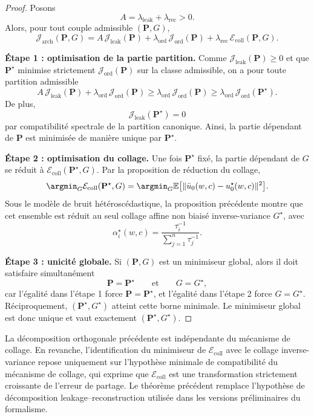 \begin{proof}
Posons
\[
A=\lambda_{\mathrm{leak}}+\lambda_{\mathrm{rec}}>0.
\]
Alors, pour tout couple admissible \((\mathbf P,G)\),
\[
\mathcal J_{\mathrm{arch}}(\mathbf P,G)
=
A\,\mathcal J_{\mathrm{leak}}(\mathbf P)
+
\lambda_{\mathrm{ord}}\,\mathcal J_{\mathrm{ord}}(\mathbf P)
+
\lambda_{\mathrm{rec}}\,\mathcal E_{\mathrm{coll}}(\mathbf P,G).
\]

\medskip
\noindent
\textbf{Étape 1 : optimisation de la partie partition.}
Comme \(\mathcal J_{\mathrm{leak}}(\mathbf P)\ge 0\) et que \(\mathbf P^\star\) minimise strictement \(\mathcal J_{\mathrm{ord}}(\mathbf P)\) sur la classe admissible, on a pour toute partition admissible
\[
A\,\mathcal J_{\mathrm{leak}}(\mathbf P)+\lambda_{\mathrm{ord}}\,\mathcal J_{\mathrm{ord}}(\mathbf P)
\ge
\lambda_{\mathrm{ord}}\,\mathcal J_{\mathrm{ord}}(\mathbf P)
\ge
\lambda_{\mathrm{ord}}\,\mathcal J_{\mathrm{ord}}(\mathbf P^\star).
\]
De plus,
\[
\mathcal J_{\mathrm{leak}}(\mathbf P^\star)=0
\]
par compatibilité spectrale de la partition canonique.
Ainsi, la partie dépendant de \(\mathbf P\) est minimisée de manière unique par \(\mathbf P^\star\).

\medskip
\noindent
\textbf{Étape 2 : optimisation du collage.}
Une fois \(\mathbf P^\star\) fixé, la partie dépendant de \(G\) se réduit à \(\mathcal E_{\mathrm{coll}}(\mathbf P^\star,G)\).
Par la proposition de réduction du collage,
\[
\argmin_G \mathcal E_{\mathrm{coll}}(\mathbf P^\star,G)
=
\argmin_G \mathbb E\bigl[\|\bar u_0(w,c)-u_0^\star(w,c)\|^2\bigr].
\]
Sous le modèle de bruit hétéroscédastique, la proposition précédente montre que cet ensemble est réduit au seul collage affine non biaisé inverse-variance \(G^\star\), avec
\[
\alpha_i^\star(w,c)=\frac{\tau_i^{-1}}{\sum_{j=1}^n\tau_j^{-1}}.
\]

\medskip
\noindent
\textbf{Étape 3 : unicité globale.}
Si \((\mathbf P,G)\) est un minimiseur global, alors il doit satisfaire simultanément
\[
\mathbf P=\mathbf P^\star
\qquad\text{et}\qquad
G=G^\star,
\]
car l'égalité dans l'étape 1 force \(\mathbf P=\mathbf P^\star\), et l'égalité dans l'étape 2 force \(G=G^\star\).
Réciproquement, \((\mathbf P^\star,G^\star)\) atteint cette borne minimale.
Le minimiseur global est donc unique et vaut exactement \((\mathbf P^\star,G^\star)\).
\end{proof}

\begin{remark}
La décomposition orthogonale précédente est indépendante du mécanisme de collage.
En revanche, l'identification du minimiseur de \(\mathcal E_{\mathrm{coll}}\) avec le collage inverse-variance repose uniquement sur l'hypothèse minimale de compatibilité du mécanisme de collage, qui exprime que \(\mathcal E_{\mathrm{coll}}\) est une transformation strictement croissante de l'erreur de partage.
Le théorème précédent remplace l'hypothèse de décomposition leakage--reconstruction utilisée dans les versions préliminaires du formalisme.
\end{remark}

